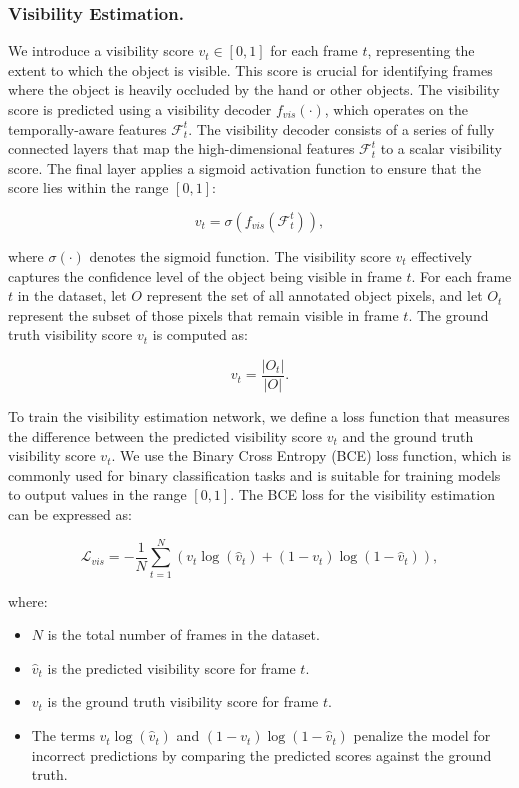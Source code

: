 \subsubsection{Visibility Estimation.}

We introduce a visibility score $v_t \in [0, 1]$ for each frame $t$, representing the extent to which the object is visible. This score is crucial for identifying frames where the object is heavily occluded by the hand or other objects. The visibility score is predicted using a visibility decoder $f_{vis}(\cdot)$, which operates on the temporally-aware features $\mathcal{F}^t_t$. The visibility decoder consists of a series of fully connected layers that map the high-dimensional features $\mathcal{F}^t_t$ to a scalar visibility score. The final layer applies a sigmoid activation function to ensure that the score lies within the range $[0, 1]$:

\begin{equation}
v_t = \sigma(f_{vis}(\mathcal{F}^t_t)),
\end{equation}

\noindent where $\sigma(\cdot)$ denotes the sigmoid function. The visibility score $v_t$ effectively captures the confidence level of the object being visible in frame $t$.  For each frame $t$ in the dataset, let $O$ represent the set of all annotated object pixels, and let $O_t$ represent the subset of those pixels that remain visible in frame $t$. The ground truth visibility score $v_t$ is computed as:

\begin{equation}
v_t = \frac{|O_t|}{|O|}.
\end{equation}

\noindent To train the visibility estimation network, we define a loss function that measures the difference between the predicted visibility score $v_t$ and the ground truth visibility score $v_t$. We use the Binary Cross Entropy (BCE) loss function, which is commonly used for binary classification tasks and is suitable for training models to output values in the range $[0, 1]$. The BCE loss for the visibility estimation can be expressed as:

\begin{equation}
\mathcal{L}_{vis} = - \frac{1}{N} \sum_{t=1}^{N} \left( v_t \log(\hat{v}_t) + (1 - v_t) \log(1 - \hat{v}_t) \right),
\end{equation}

\noindent where:
\begin{itemize}
    \item $N$ is the total number of frames in the dataset.
    \item $\hat{v}_t$ is the predicted visibility score for frame $t$.
    \item $v_t$ is the ground truth visibility score for frame $t$.
    \item The terms $v_t \log(\hat{v}_t)$ and $(1 - v_t) \log(1 - \hat{v}_t)$ penalize the model for incorrect predictions by comparing the predicted scores against the ground truth.
\end{itemize}


